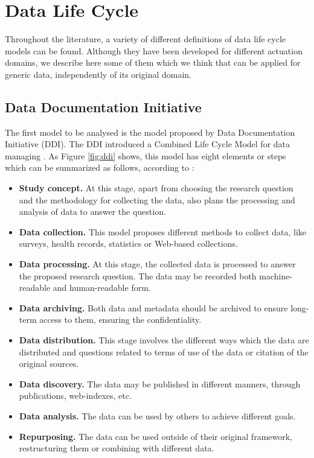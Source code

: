 \section{Data Life Cycle}

Throughout the literature, a variety of different definitions of data life cycle models can be found. Although they have been developed for different actuation domains, we describe here some of them which we think that can be applied for generic data, independently of its original domain.

\subsection{Data Documentation Initiative}

The first model to be analysed is the model proposed by Data Documentation Initiative (DDI). The DDI introduced a Combined Life Cycle Model for data managing \cite{data_documentation_initiative_overview_2008}. As Figure \ref{fig:ddi} shows, this model has eight elements or steps which can be summarized as follows, according to \cite{ball_review_2012}:

\begin{itemize}
    \item \textbf{Study concept.} At this stage, apart from choosing the research question and the methodology for collecting the data, also plans the processing and analysis of data to answer the question.
    \item \textbf{Data collection.} This model proposes different methods to collect data, like surveys, health records, statistics or Web-based collections.
    \item \textbf{Data processing.} At this stage, the collected data is processed to answer the proposed research question. The data may be recorded both machine-readable and human-readable form.
    \item \textbf{Data archiving.} Both data and metadata should be archived to ensure long-term access to them, ensuring the confidentiality.
    \item \textbf{Data distribution.} This stage involves the different ways which the data are distributed and questions related to terms of use of the data or citation of the original sources. 
    \item \textbf{Data discovery.} The data may be published in different manners, through publications, web-indexes, etc.
    \item \textbf{Data analysis.} The data can be used by others to achieve different goals.
    \item \textbf{Repurposing.} The data can be used outside of their original framework, restructuring them or combining with different data.
\end{itemize}

